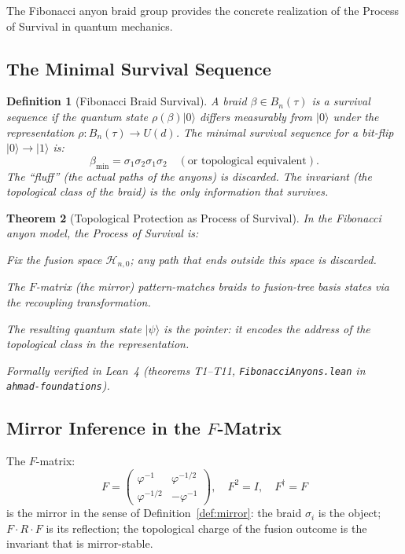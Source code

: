 \documentclass[11pt,letterpaper]{article}
\newtheorem{theorem}{Theorem}[section]
\newtheorem{definition}[theorem]{Definition}
\begin{document}
The Fibonacci anyon braid group provides the concrete realization of the
Process of Survival in quantum mechanics.

\subsection{The Minimal Survival Sequence}

\begin{definition}[Fibonacci Braid Survival]
A braid $\beta \in B_n(\tau)$ is a \emph{survival sequence} if the quantum
state $\rho(\beta)|0\rangle$ differs measurably from $|0\rangle$ under the
representation $\rho: B_n(\tau) \to U(d)$.  The minimal survival sequence
for a bit-flip $|0\rangle \to |1\rangle$ is:
\[
\beta_{\min} = \sigma_1 \sigma_2 \sigma_1 \sigma_2 \quad (\text{or topological equivalent}).
\]
The ``fluff'' (the actual paths of the anyons) is discarded.
The invariant (the topological class of the braid) is the only information
that survives.
\end{definition}

\begin{theorem}[Topological Protection as Process of Survival]
In the Fibonacci anyon model, the Process of Survival is:
\begin{description}[nosep]
\item[\textbf{Frame}] Fix the fusion space $\mathcal{H}_{n,0}$; any path that
  ends outside this space is discarded.
\item[\textbf{Search}] The $F$-matrix (the mirror) pattern-matches braids to
  fusion-tree basis states via the recoupling transformation.
\item[\textbf{Address}] The resulting quantum state $|\psi\rangle$ is the
  pointer: it encodes the address of the topological class in the
  representation.
\end{description}
\textit{Formally verified in Lean~4 (theorems T1--T11, \texttt{FibonacciAnyons.lean}
in \texttt{ahmad-foundations}).}
\end{theorem}

\subsection{Mirror Inference in the $F$-Matrix}

The $F$-matrix:
\[
F = \begin{pmatrix} \varphi^{-1} & \varphi^{-1/2} \\ \varphi^{-1/2} & -\varphi^{-1} \end{pmatrix},
\quad F^2 = I, \quad F^\dagger = F
\]
is the mirror in the sense of Definition~\ref{def:mirror}:
the braid $\sigma_i$ is the object; $F \cdot R \cdot F$ is its reflection;
the topological charge of the fusion outcome is the invariant that is
mirror-stable.
\end{document}
